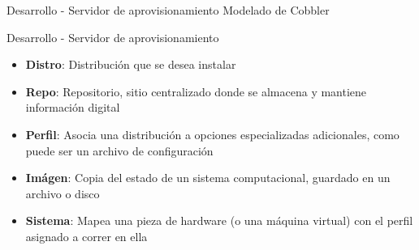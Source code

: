 \begin{frame}{Desarrollo - Servidor de aprovisionamiento}
    \vspace{0cm} {Modelado de Cobbler}
    \vspace{0.5cm}
    \begin{figure}[ht]
       \centering
       \vspace{-0.50cm}
    \end{figure}
\end{frame}

\begin{frame}{Desarrollo - Servidor de aprovisionamiento}
    \vspace{0cm}
    \begin{itemize}
        \item \textbf{Distro}: Distribución que se desea instalar
        \item \textbf{Repo}: Repositorio, sitio centralizado donde se almacena y mantiene información digital
        \item \textbf{Perfil}: Asocia una distribución a opciones especializadas adicionales, como puede ser un archivo de configuración
        \item \textbf{Imágen}: Copia del estado de un sistema computacional, guardado en un archivo o disco
        \item \textbf{Sistema}: Mapea una pieza de hardware (o una máquina virtual) con el perfil asignado a correr en ella
    \end{itemize}

\end{frame}

